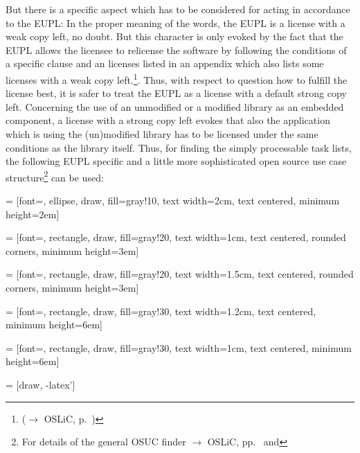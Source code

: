 But there is a specific aspect which has to be considered for acting in
accordance to the EUPL: In the proper meaning of the words, the EUPL is a
license with a weak copy left, no doubt. But this character is only evoked by
the fact that the EUPL allows the licensee to relicense the software by
following the conditions of a specific clause and an licenses listed in an
appendix which also lists some licenses with a weak copy
left.\footnote{($\rightarrow$ OSLiC, p.\ )}.
Thus, with respect to question how to fulfill the license best, it is safer to
treat the EUPL as a license with a default strong copy left. Concerning the use
of an unmodified or a modified library as an embedded component, a license with
a strong copy left evokes that also the application which is using the
(un)modified library has to be licensed under the same conditions as the library
itself. Thus, for finding the simply processable task lists, the following EUPL
specific and a little more sophisticated open source use case
structure\footnote{For details of the general OSUC finder $\rightarrow$ OSLiC,
pp.\ \pageref{OsucTokens} and \pageref{OsucDefinitionTree}} can be used:
 
 
 
 = [font=\scriptsize, ellipse, draw, fill=gray!10, 
    text width=2cm, text centered, minimum height=2em]

 = [font=\tiny, rectangle, draw, fill=gray!20, 
    text width=1cm, text centered, rounded corners, minimum height=3em]

 = [font=\tiny, rectangle, draw, fill=gray!20, 
    text width=1.5cm, text centered, rounded corners, minimum height=3em]
    
 = [font=\tiny, rectangle, draw, fill=gray!30, 
    text width=1.2cm, text centered, minimum height=6em]

 = [font=\tiny, rectangle, draw, fill=gray!30, 
    text width=1cm, text centered, minimum height=6em]


 = [draw, -latex']

